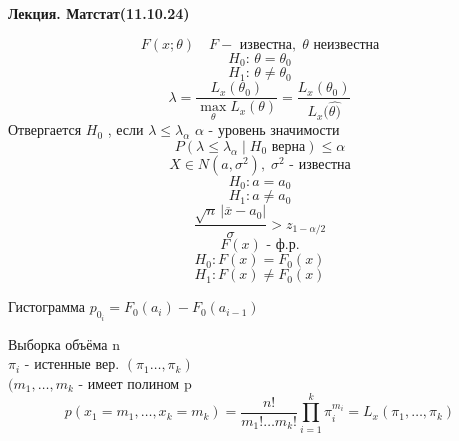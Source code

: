 \documentclass[a4paper]{article}
\begin{document}
\begin{center}
    \textbf{Лекция. Матстат(11.10.24)}
\end{center}
\[
    F(x; \theta) \quad F - \text{ известна}, \; \theta\text{ неизвестна}
\]
\[
    H_0: \, \theta = \theta_0
\]
\[
    H_1: \, \theta \neq \theta_0
\]
\[
    \lambda = \frac{L_{x}(\theta_0)}{\max_{\theta} L_x(\theta)} = \frac{L_x(\theta_0)}
    {L_x(\hat{\theta)}} 
\]
Отвергается $ H_0 $ , если $ \lambda \leq \lambda_{\alpha} $ $ \alpha $ - 
уровень значимости
\[
    P(\lambda \leq \lambda_{\alpha} \; | \; H_0 \text{ верна}) \leq \alpha
\]
\[
    X \in N(a, \sigma^2), \; \sigma^2 \text{ - известна}
\]
\[
    H_0: a = a_0
\]
\[
    H_1: a \neq a_0
\]
\[
    \frac{\sqrt{n} \, | \overline{x} - a_0 |}{\sigma} > z_{1 - \alpha/2}
\]
\[
    F(x) \text{ - ф.р.}
\]
\[
    H_0: F(x) = F_0(x)
\]
\[
    H_1: F(x) \neq F_0(x)
\]

Гистограмма $ p_{0_{i}} = F_0(a_{i}) - F_0(a_{i-1}) $ 

Выборка объёма n\\
$ \pi_{i} $ - истенные вер.
$ ( \pi_{1} \dots, \pi_{k}) $ \\
$ (m_1, \dots, m_{k} $ - имеет полином p
\[
    p(x_1 = m_1, \dots, x_{k} = m_{k}) = \frac{n!}{m_1! \dots m_{k}!} 
    \prod_{i=1}^{k} \pi_{i}^{m_{i}} = L_{x}(\pi_1, \dots , \pi_{k})
\]
\end{document}

